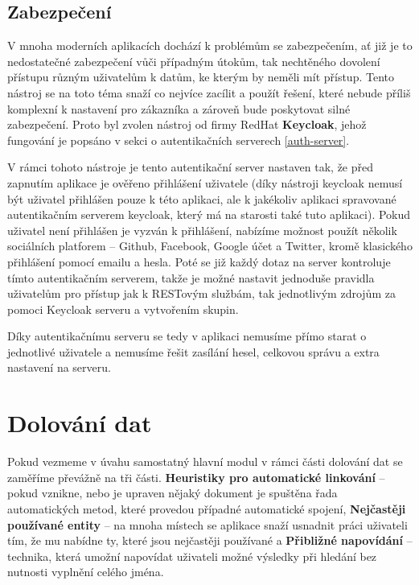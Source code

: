 \subsection{Zabezpečení}
\par V mnoha moderních aplikacích dochází k problémům se zabezpečením, ať již je to nedostatečné zabezpečení vůči případným útokům, tak nechtěného dovolení přístupu různým uživatelům k datům, ke kterým by neměli mít přístup. Tento nástroj se na toto téma snaží co nejvíce zacílit a použít řešení, které nebude příliš komplexní k nastavení pro zákazníka a zároveň bude poskytovat silné zabezpečení. Proto byl zvolen nástroj od firmy RedHat \textbf{Keycloak}, jehož fungování je popsáno v sekci o autentikačních serverech \ref{auth-server}.

\par V rámci tohoto nástroje je tento autentikační server nastaven tak, že před zapnutím aplikace je ověřeno přihlášení uživatele (díky nástroji keycloak nemusí být uživatel přihlášen pouze k této aplikaci, ale k jakékoliv aplikaci spravované autentikačním serverem keycloak, který má na starosti také tuto aplikaci). Pokud uživatel není přihlášen je vyzván k přihlášení, nabízíme možnost použít několik sociálních platforem -- Github, Facebook, Google účet a Twitter, kromě klasického přihlášení pomocí emailu a hesla. Poté se již každý dotaz na server kontroluje tímto autentikačním serverem, takže je možné nastavit jednoduše pravidla uživatelům pro přístup jak k RESTovým službám, tak jednotlivým zdrojům za pomoci Keycloak serveru a vytvořením skupin.

\par Díky autentikačnímu serveru se tedy v aplikaci nemusíme přímo starat o jednotlivé uživatele a nemusíme řešit zasílání hesel, celkovou správu a extra nastavení na serveru.

\section{Dolování dat}
\par Pokud vezmeme v úvahu samostatný hlavní modul v rámci části dolování dat se zaměříme převážně na tři části. \textbf{Heuristiky pro automatické linkování} -- pokud vznikne, nebo je upraven nějaký dokument je spuštěna řada automatických metod, které provedou případné automatické spojení, \textbf{Nejčastěji používané entity} -- na mnoha místech se aplikace snaží usnadnit práci uživateli tím, že mu nabídne ty, které jsou nejčastěji používané a \textbf{Přibližné napovídání} -- technika, která umožní napovídat uživateli možné výsledky při hledání bez nutnosti vyplnění celého jména.

